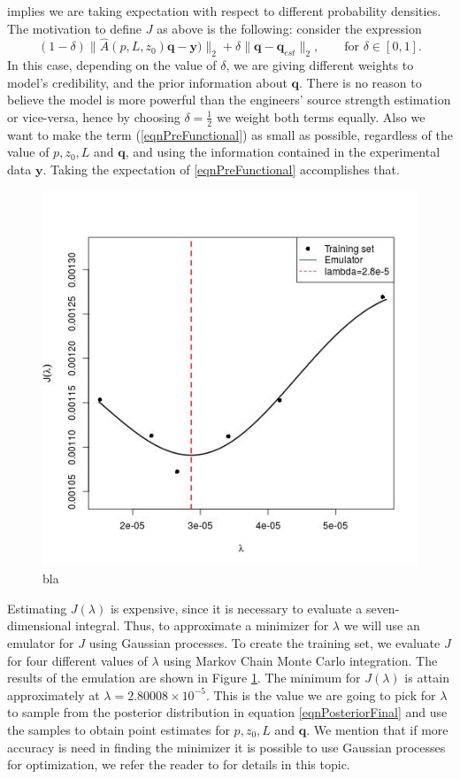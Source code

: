 \documentclass[12pt]{book}
\newcommand{\q}{\textbf{q}}
\newcommand{\pars}{p,z_{0},L}
\newcommand{\y}{\textbf{y}}
\begin{document}
implies we are taking expectation with respect to different probability densities. The motivation
to define $J$ as above is the following: consider
the expression
\begin{equation}\label{eqnPreFunctional}
(1-\delta)\|\widehat{A}(p,L,z_{0})\q-\y)\|_{2}+\delta\|\q-\q_{est}\|_{2},\qquad\text{for }\delta\in [0,1].
\end{equation}
In this case, depending on the value of $\delta$, we are giving different weights to model's credibility,
and the prior information about $\q$. There is no reason to believe the model is more powerful than
the engineers' source strength estimation or vice-versa,  hence by choosing $\delta=\frac{1}{2}$
we weight both terms equally. Also we want to make the term (\ref{eqnPreFunctional}) as small
as possible, regardless of the value of $\pars$ and $\q$, and using the information
contained in the experimental data $\y$. Taking the expectation of \eqref{eqnPreFunctional}
accomplishes that. 

\begin{figure}
\centering
\includegraphics[scale=0.5]{./FigChap4/lambdaEmul}
\caption{bla}
\label{figLambdaEmul}
\end{figure}

Estimating $J(\lambda)$ is expensive, since  it is necessary to evaluate a seven-dimensional
integral. Thus, to approximate a minimizer for $\lambda$  we will use an emulator for $J$ using Gaussian processes. 
To create the training set, we evaluate
$J$ for four different values of $\lambda$ using Markov Chain Monte Carlo integration.
The results of the emulation are shown in Figure \ref{figLambdaEmul}. The minimum for 
$J(\lambda)$ is attain approximately at $\lambda=2.80008\times 10^{-5}$. This
is the value we are going to pick for $\lambda$ to sample from the
posterior distribution in equation \eqref{eqnPosteriorFinal} and use the samples
to obtain point estimates for $\pars$ and $\q$. We mention that if more
accuracy is need in finding the minimizer it is possible to use Gaussian processes
for optimization, we refer the reader to \cite{osborne2009gaussian} for details in this topic.
\end{document}
